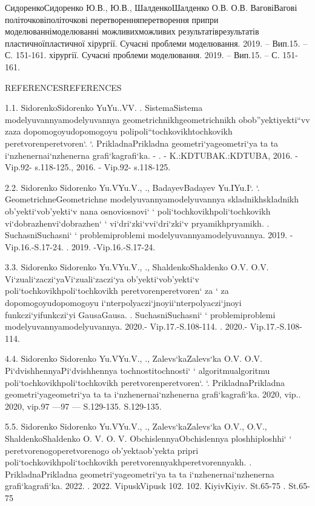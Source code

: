 \documentclass[12pt,a4paper]{article}
\begin{document}
\par
СидоренкоСидоренко Ю.В.,  Ю.В., ШалденкоШалденко О.В.  О.В. ВаговіВагові  політочковіполіточкові  перетворенняперетворення  припри  моделюваннімоделюванні  можливихможливих  результатіврезультатів  пластичноїпластичної хірургії. Сучасні проблеми моделювання. 2019. – Вип.15. – С. 151-161. хірургії. Сучасні проблеми моделювання. 2019. – Вип.15. – С. 151-161.
\par
REFERENCESREFERENCES
\par
1.1.	SidorenkoSidorenko  YuYu..VV. . SistemaSistema  modelyuvannyamodelyuvannya  geometrichnikhgeometrichnikh  obob''yektiyekti``vv  zaza  dopomogoyudopomogoyu  polipoli``tochkovikhtochkovikh  peretvorenperetvoren`. `. PrikladnaPrikladna  geometri`yageometri`ya ta  ta i`nzhenernai`nzhenerna  grafi`kagrafi`ka. - . - K.:KDTUBAK.:KDTUBA, 2016. - Vip.92- s.118-125., 2016. - Vip.92- s.118-125.
\par
2.2.	Sidorenko Sidorenko Yu.VYu.V., ., BadayevBadayev  Yu.IYu.I`. `. GeometrichneGeometrichne  modelyuvannyamodelyuvannya  skladnikhskladnikh  ob'yekti`vob'yekti`v  nana  osnoviosnovi` ` poli`tochkovikhpoli`tochkovikh  vi`dobrazhenvi`dobrazhen` ` vi`dri`zki`vvi`dri`zki`v  pryamikhpryamikh. . SuchasniSuchasni` ` problemiproblemi  modelyuvannyamodelyuvannya. 2019. -Vip.16.-S.17-24.  . 2019. -Vip.16.-S.17-24.
\par
3.3.	Sidorenko Sidorenko Yu.VYu.V., ., ShaldenkoShaldenko O.V.  O.V. Vi`zuali`zaczi`yaVi`zuali`zaczi`ya  ob'yekti`vob'yekti`v  poli`tochkovikhpoli`tochkovikh  peretvorenperetvoren` za ` za dopomogoyudopomogoyu  i`nterpolyaczi`jnoyii`nterpolyaczi`jnoyi  funkczi`yifunkczi`yi  GausaGausa. . SuchasniSuchasni` ` problemiproblemi  modelyuvannyamodelyuvannya. 2020.- Vip.17.-S.108-114. . 2020.- Vip.17.-S.108-114.
\par
4.4.	Sidorenko Sidorenko Yu.VYu.V., ., Zalevs`kaZalevs`ka O.V.  O.V. Pi`dvishhennyaPi`dvishhennya  tochnostitochnosti` ` algoritmualgoritmu  poli`tochkovikhpoli`tochkovikh  peretvorenperetvoren`.  `.  PrikladnaPrikladna  geometri`yageometri`ya ta  ta i`nzhenernai`nzhenerna  grafi`kagrafi`ka.  2020, vip..  2020, vip.97  —97  —  S.129-135.      S.129-135.
\par
5.5.	Sidorenko Sidorenko Yu.VYu.V., ., Zalevs`kaZalevs`ka O.V.,  O.V., ShaldenkoShaldenko O. V.  O. V. ObchislennyaObchislennya  ploshhiploshhi` ` peretvorenogoperetvorenogo  ob'yektaob'yekta  pripri  poli`tochkovikhpoli`tochkovikh  peretvorennyakhperetvorennyakh. . PrikladnaPrikladna  geometri`yageometri`ya ta  ta i`nzhenernai`nzhenerna  grafi`kagrafi`ka. 2022. . 2022. VipuskVipusk 102.  102. KiyivKiyiv. St.65-75 . St.65-75
\end{document}
